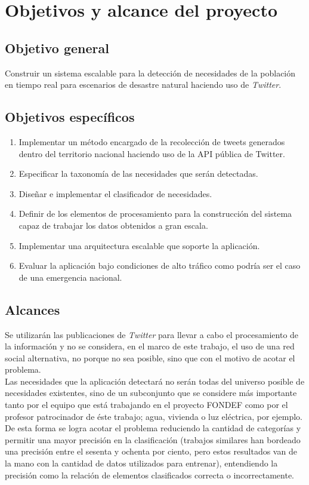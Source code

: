 \section{Objetivos y alcance del proyecto}
\label{intro:objetivos}

\subsection{Objetivo general}
	Construir un sistema escalable para la detección de necesidades de la población en tiempo real para escenarios de desastre natural haciendo uso de \textit{Twitter}.

\subsection{Objetivos específicos}
\begin{enumerate}
\item	Implementar un método encargado de la recolección de tweets generados dentro del territorio nacional haciendo uso de la API pública de Twitter.
\item	Especificar la taxonomía de las necesidades que serán detectadas.
\item	Diseñar e implementar el clasificador de necesidades.
\item	Definir de los elementos de procesamiento para la construcción del sistema capaz de trabajar los datos obtenidos a gran escala.
\item	Implementar una arquitectura escalable que soporte la aplicación.
\item	Evaluar la aplicación bajo condiciones de alto tráfico como podría ser el caso de una emergencia nacional.
\end{enumerate}

\subsection{Alcances}
Se utilizarán las publicaciones de \textit{Twitter} para llevar a cabo el procesamiento de la información y no se considera, en el marco de este trabajo, el uso de una red social alternativa, no porque no sea posible, sino que con el motivo de acotar el problema.\\

Las necesidades que la aplicación detectará no serán todas del universo posible de necesidades existentes, sino de un subconjunto que se considere más importante tanto por el equipo que está trabajando en el proyecto FONDEF como por el profesor patrocinador de éste trabajo; agua, vivienda o luz eléctrica, por ejemplo. De esta forma se logra acotar el problema reduciendo la cantidad de categorías y permitir una mayor precisión en la clasificación (trabajos similares han bordeado una precisión entre el sesenta y ochenta por ciento, pero estos resultados van de la mano con la cantidad de datos utilizados para entrenar), entendiendo la precisión como la relación de elementos clasificados correcta o incorrectamente.\\

